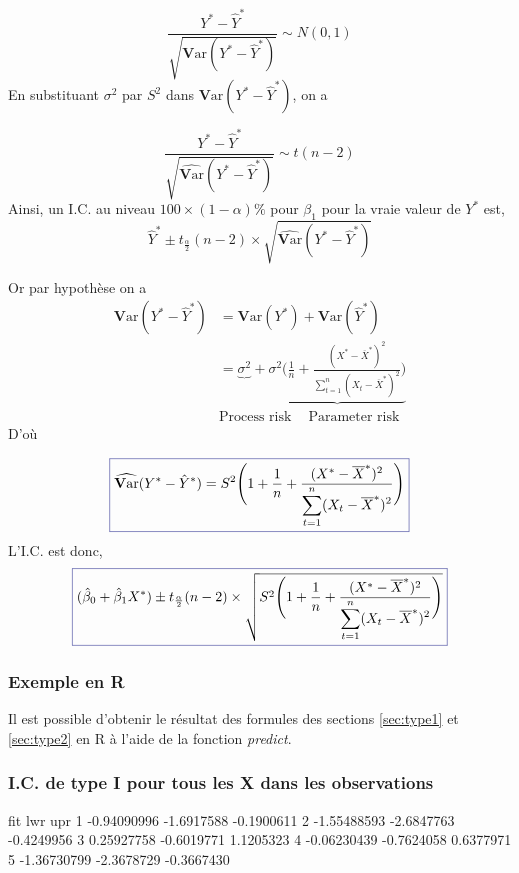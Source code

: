 \documentclass[11pt,french]{report}
\newcommand{\Var}{\mathrm{\textbf{V}ar}}
\begin{document}
$$
\frac{Y^* - \hat{Y}^*}{\sqrt{\Var(Y^* - \hat{Y}^*)}} \sim N(0,1)
$$
En substituant $\sigma^2$ par $S^2$ dans $\Var(Y^* - \hat{Y}^*)$, on a

$$
\frac{Y^* - \hat{Y}^*}{\sqrt{\widehat{\Var}(Y^* - \hat{Y}^*)}} \sim t(n-2)
$$
Ainsi, un I.C. au niveau $100 \times (1 - \alpha)\%$ pour $\beta_1$  pour la vraie valeur de $Y^*$ est,
$$
\hat{Y}^* \pm t_{\frac{\alpha}{2}}(n-2)\times \sqrt{\widehat{\Var}(Y^* - \hat{Y}^*)}
$$

Or par hypothèse on a
\begin{align*}
\Var(Y^* - \hat{Y}^*) &= \Var(Y^*) + \Var(\hat{Y}^*) \\
&= \underbrace{\sigma^2} +\underbrace{\sigma^2\Bigg( \frac{1}{n} + \frac{(X^* - \overline{X}^*)^2}{\displaystyle\sum_{t=1}^n (X_t - \overline{X}^*)^2}\Bigg)}  \\
&   \text{Process risk }\ \ \ \  \text{Parameter risk}
\end{align*}
D'où 

\begin{equation}
\label{eq:var2*}
\color{Blue}
\boxed{\color{black}
\widehat{\Var}(Y^* - \hat{Y}^*) = S^2 \Bigg(1 + \frac{1}{n} + \frac{(X^* - \overline{X}^*)^2}{\displaystyle\sum_{t=1}^n (X_t - \overline{X}^*)^2}\Bigg)  
}
\end{equation}
L'I.C. est donc,
\begin{equation}
\label{eq:IC3}
\color{Blue}
\boxed{\color{black}
(\hat{\beta}_0 + \hat{\beta}_1X^*) \pm t_{\frac{\alpha}{2}}(n-2)\times \sqrt{S^2 \Bigg(1 + \frac{1}{n} + \frac{(X^* - \overline{X}^*)^2}{\displaystyle\sum_{t=1}^n (X_t - \overline{X}^*)^2}\Bigg)}  
}
\end{equation}

\subsubsection*{Exemple en R}
Il est possible d'obtenir le résultat des formules des sections \ref{sec:type1} et \ref{sec:type2} en R à l'aide de la fonction \emph{predict}.

\subsubsection*{I.C. de type I pour tous les X dans les observations}
\begin{Schunk}
\begin{Soutput}
          fit        lwr        upr
1 -0.94090996 -1.6917588 -0.1900611
2 -1.55488593 -2.6847763 -0.4249956
3  0.25927758 -0.6019771  1.1205323
4 -0.06230439 -0.7624058  0.6377971
5 -1.36730799 -2.3678729 -0.3667430
\end{Soutput}
\end{Schunk}
\end{document}
